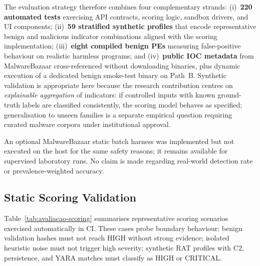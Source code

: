 The evaluation strategy therefore combines four complementary strands: (i)~\textbf{220 automated
tests} exercising API contracts, scoring logic, sandbox drivers, and UI components; (ii)~\textbf{59
stratified synthetic profiles} that encode representative benign and malicious indicator
combinations aligned with the scoring implementation; (iii)~\textbf{eight compiled benign PEs}
measuring false-positive behaviour on realistic harmless programs; and (iv)~\textbf{public IOC
metadata} from MalwareBazaar cross-referenced without downloading binaries, plus dynamic execution
of a dedicated benign smoke-test binary on Path~B. Synthetic validation is appropriate here
because the research contribution centres on \emph{explainable aggregation} of indicators: if
controlled inputs with known ground-truth labels are classified consistently, the scoring model
behaves as specified; generalisation to unseen families is a separate empirical question requiring
curated malware corpora under institutional approval.

An optional MalwareBazaar static batch harness was implemented but not executed on the host for
the same safety reasons; it remains available for supervised laboratory runs. No claim is made
regarding real-world detection rate or prevalence-weighted accuracy.

\subsection{Static Scoring Validation}

Table~\ref{tab:avaliacao-scoring} summarises representative scoring scenarios exercised
automatically in CI. These cases probe boundary behaviour: benign validation hashes must not reach
HIGH without strong evidence; isolated heuristic noise must not trigger high severity; synthetic
RAT profiles with C2, persistence, and YARA matches must classify as HIGH or CRITICAL.

